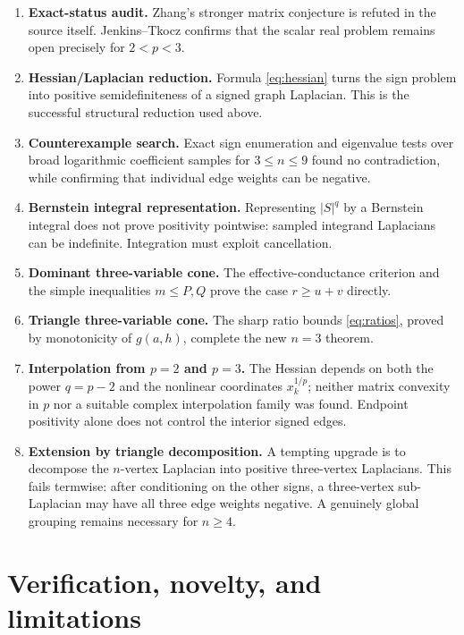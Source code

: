 \documentclass[11pt]{article}
\begin{document}
\begin{enumerate}
\item \textbf{Exact-status audit.}  Zhang's stronger matrix conjecture is
refuted in the source itself.  Jenkins--Tkocz confirms that the scalar real
problem remains open precisely for $2<p<3$.

\item \textbf{Hessian/Laplacian reduction.}  Formula \eqref{eq:hessian}
turns the sign problem into positive semidefiniteness of a signed graph
Laplacian.  This is the successful structural reduction used above.

\item \textbf{Counterexample search.}  Exact sign enumeration and
eigenvalue tests over broad logarithmic coefficient samples for
$3\leq n\leq9$ found no contradiction, while confirming that individual
edge weights can be negative.

\item \textbf{Bernstein integral representation.}  Representing $|S|^q$
by a Bernstein integral does not prove positivity pointwise: sampled
integrand Laplacians can be indefinite.  Integration must exploit
cancellation.

\item \textbf{Dominant three-variable cone.}  The effective-conductance
criterion and the simple inequalities $m\leq P,Q$ prove the case
$r\geq u+v$ directly.

\item \textbf{Triangle three-variable cone.}  The sharp ratio bounds
\eqref{eq:ratios}, proved by monotonicity of $g(a,h)$, complete the new
$n=3$ theorem.

\item \textbf{Interpolation from $p=2$ and $p=3$.}  The Hessian depends on
both the power $q=p-2$ and the nonlinear coordinates $x_k^{1/p}$; neither
matrix convexity in $p$ nor a suitable complex interpolation family was
found.  Endpoint positivity alone does not control the interior signed
edges.

\item \textbf{Extension by triangle decomposition.}  A tempting upgrade is
to decompose the $n$-vertex Laplacian into positive three-vertex Laplacians.
This fails termwise: after conditioning on the other signs, a three-vertex
sub-Laplacian may have all three edge weights negative.  A genuinely global
grouping remains necessary for $n\geq4$.
\end{enumerate}

\section{Verification, novelty, and limitations}
\end{document}

